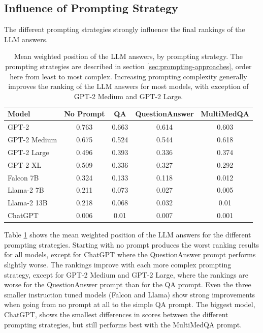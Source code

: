 \subsection{Influence of Prompting Strategy}
The different prompting strategies strongly influence the final rankings of the LLM answers.
\begin{table}[tb]
\centering
\begin{tabular}{lcccc}
\textbf{Model}        & \textbf{No Prompt} & \textbf{QA}     & \textbf{QuestionAnswer} & \textbf{MultiMedQA} \\\hline
GPT-2        & 0.763      & 0.663 & 0.614    & 0.603      \\
GPT-2 Medium & 0.675      & 0.524 & 0.544    & 0.618      \\
GPT-2 Large  & 0.496      & 0.393 & 0.336    & 0.374      \\
GPT-2 XL     & 0.509      & 0.336 & 0.327    & 0.292      \\
Falcon 7B    & 0.324      & 0.133 & 0.118    & 0.012      \\
Llama-2 7B   & 0.211      & 0.073 & 0.027    & 0.005      \\
Llama-2 13B  & 0.218      & 0.068 & 0.032    & 0.01       \\
ChatGPT      & 0.006      & 0.01  & 0.007    & 0.001     
\end{tabular}
\caption{Mean weighted position of the LLM answers, by prompting strategy.
The prompting strategies are described in section \ref{sec:prompting-approaches}, order here from least to most complex.
Increasing prompting complexity generally improves the ranking of the LLM answers for most models, with exception of GPT-2 Medium and GPT-2 Large.
}
\label{tab:prompting_strategy}
\end{table}
Table \ref{tab:prompting_strategy} shows the mean weighted position of the LLM answers for the different prompting strategies.
Starting with no prompt produces the worst ranking results for all models, except for ChatGPT where the QuestionAnswer prompt performs slightly worse.
The rankings improve with each more complex prompting strategy, except for GPT-2 Medium and GPT-2 Large, where the rankings are worse for the QuestionAnswer prompt than for the QA prompt.
Even the three smaller instruction tuned models (Falcon and Llama) show strong improvements when going from no prompt at all to the simple QA prompt.
The biggest model, ChatGPT, shows the smallest differences in scores between the different prompting strategies, but still performs best with the MultiMedQA prompt.

